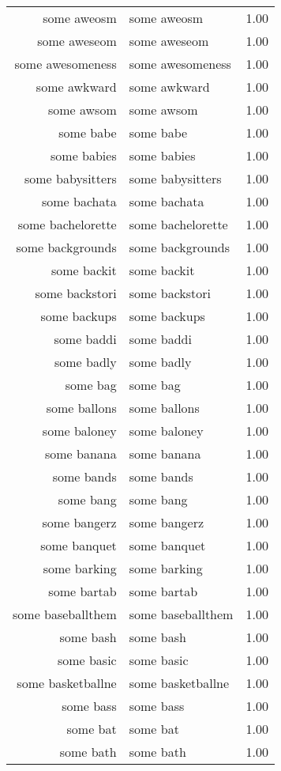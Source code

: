 \begin{table}[ht]
\begin{tabular}{rlr}
  some aweosm & some aweosm & 1.00 \\ 
  some aweseom & some aweseom & 1.00 \\ 
  some awesomeness & some awesomeness & 1.00 \\ 
  some awkward & some awkward & 1.00 \\ 
  some awsom & some awsom & 1.00 \\ 
  some babe & some babe & 1.00 \\ 
  some babies & some babies & 1.00 \\ 
  some babysitters & some babysitters & 1.00 \\ 
  some bachata & some bachata & 1.00 \\ 
  some bachelorette & some bachelorette & 1.00 \\ 
  some backgrounds & some backgrounds & 1.00 \\ 
  some backit & some backit & 1.00 \\ 
  some backstori & some backstori & 1.00 \\ 
  some backups & some backups & 1.00 \\ 
  some baddi & some baddi & 1.00 \\ 
  some badly & some badly & 1.00 \\ 
  some bag & some bag & 1.00 \\ 
  some ballons & some ballons & 1.00 \\ 
  some baloney & some baloney & 1.00 \\ 
  some banana & some banana & 1.00 \\ 
  some bands & some bands & 1.00 \\ 
  some bang & some bang & 1.00 \\ 
  some bangerz & some bangerz & 1.00 \\ 
  some banquet & some banquet & 1.00 \\ 
  some barking & some barking & 1.00 \\ 
  some bartab & some bartab & 1.00 \\ 
  some baseballthem & some baseballthem & 1.00 \\ 
  some bash & some bash & 1.00 \\ 
  some basic & some basic & 1.00 \\ 
  some basketballne & some basketballne & 1.00 \\ 
  some bass & some bass & 1.00 \\ 
  some bat & some bat & 1.00 \\ 
  some bath & some bath & 1.00 \\ 

\end{tabular}
\end{table}
